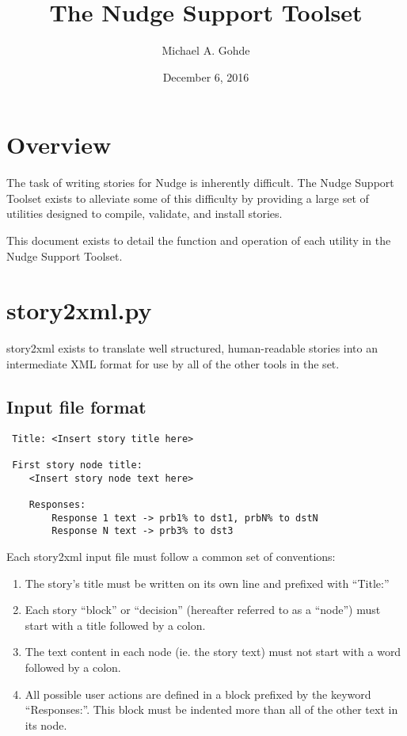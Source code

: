 \documentclass[12pt,letterpaper]{article}
\begin{document}
 
 \title{The Nudge Support Toolset}
 \author{Michael A. Gohde}
 \date{December 6, 2016}
 \maketitle
 
 \section{Overview}
 The task of writing stories for Nudge is inherently difficult. The Nudge
 Support Toolset exists to alleviate some of this difficulty by providing
 a large set of utilities designed to compile, validate, and install stories.
 
 This document exists to detail the function and operation of each utility
 in the Nudge Support Toolset.
 
 \section{story2xml.py}
 story2xml exists to translate well structured, human-readable stories into 
 an intermediate XML format for use by all of the other tools in the set.
 
 \subsection{Input file format}
 \lstset{numbers=left, frame=shadowbox}
 \begin{lstlisting}
 Title: <Insert story title here>
 
 First story node title:
    <Insert story node text here>
    
    Responses:
        Response 1 text -> prb1% to dst1, prbN% to dstN
        Response N text -> prb3% to dst3
 \end{lstlisting}
 
 Each story2xml input file must follow a common set of conventions:
 \begin{enumerate}
   \item The story's title must be written on its own line and prefixed with ``Title:''
   \item Each story ``block'' or ``decision'' (hereafter referred to as a ``node'') must start with a title followed by a colon.
   \item The text content in each node (ie. the story text) must not start with a word followed by a colon.
   \item All possible user actions are defined in a block prefixed by the keyword ``Responses:''. This block must be indented more than all of the other text in its node.
 \end{enumerate}
 
\end{document}
